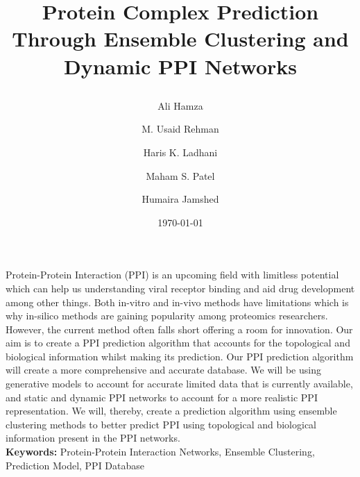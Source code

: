 \documentclass[25pt, a0paper, portrait]{tikzposter}
\title{\parbox{\linewidth}{\centering Protein Complex Prediction Through Ensemble Clustering and Dynamic PPI Networks}}
\author[1]{Ali Hamza}
\author[1]{M. Usaid Rehman}
\author[1]{Haris K. Ladhani}
\author[1]{Maham S. Patel}
\author[2]{Humaira Jamshed}
\date{\today}
\institute{Habib University}
\affil[1]{Dhanani School of Science \& Engineering, Habib University}
\affil[2]{Integrated Sciences \& Mathematics, Habib University}
\makeatletter
\def\maketitle{\AB@maketitle}
\makeatother
\begin{document}
\maketitle
\block{~}
{
   {\large Protein-Protein Interaction (PPI) is an upcoming field with limitless 
potential which can help us understanding viral receptor binding and 
aid drug development among other things. Both in-vitro and in-vivo 
methods have limitations which is why in-silico methods are gaining 
popularity among proteomics researchers. However, the current method 
often falls short offering a room for innovation. Our aim is to create 
a PPI prediction algorithm that accounts for the topological and 
biological information whilst making its prediction. Our PPI prediction algorithm will create a more comprehensive and accurate database. We 
will be using generative models to account for accurate limited data 
that is currently available, and static and dynamic PPI networks to 
account for a more realistic PPI representation. We will, thereby, 
create a prediction algorithm using ensemble clustering methods to 
better predict PPI using topological and biological information present in the PPI networks.} \\

\textbf{Keywords:} Protein-Protein Interaction Networks, Ensemble Clustering, Prediction Model, PPI Database 
}
\end{document}
